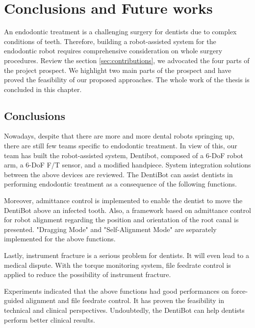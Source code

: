 \chapter{Conclusions and Future works}
\hspace*{6mm}An endodontic treatment is a challenging surgery for dentists due to complex conditions of teeth. Therefore, building a robot-assisted system for the endodontic robot requires comprehensive consideration on whole surgery procedures. Review the section \ref{sec:contributions}, we advocated the four parts of the project prospect. We highlight two main parts of the prospect and have proved the feasibility of our proposed approaches. The whole work of the thesis is concluded in this chapter.
\section{Conclusions}
\hspace*{6mm}Nowadays, despite that there are more and more dental robots springing up, there are still few teams specific to endodontic treatment. In view of this, our team has built the robot-assisted system, Dentibot, composed of a 6-DoF robot arm, a 6-DoF F/T sensor, and a modified handpiece. System integration solutions between the above devices are reviewed. The DentiBot can assist dentists in performing endodontic treatment as a consequence of the following functions. 
\par
Moreover, admittance control is implemented to enable the dentist to move the DentiBot above an infected tooth. Also, a framework based on admittance control for robot alignment regarding the position and orientation of the root canal is presented. "Dragging Mode" and "Self-Alignment Mode" are separately implemented for the above functions.
\par
Lastly, instrument fracture is a serious problem for dentists. It will even lead to a medical dispute. With the torque monitoring system, file feedrate control is applied to reduce the possibility of instrument fracture. 
\par
Experiments indicated that the above functions had good performances on force-guided alignment and file feedrate control. It has proven the feasibility in technical and clinical perspectives. Undoubtedly, the DentiBot can help dentists perform better clinical results.
